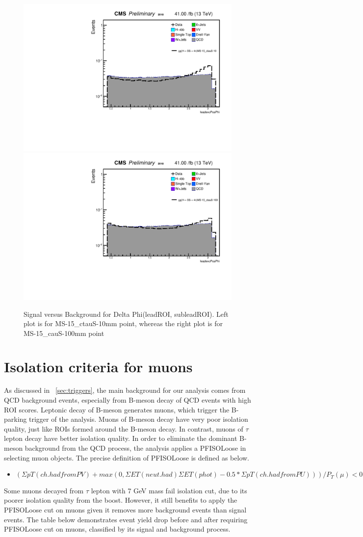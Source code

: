  \begin{figure}[h!]
   \caption{Signal versus Background for Delta Phi(leadROI, subleadROI). Left plot is for MS-15\_ctauS-10mm point, whereas the right plot is for MS-15\_cauS-100mm point}
   \label{fig:leadexcPosPhi}
   \centering
   \includegraphics[width=0.40\linewidth]{figs/AnalysisNoteplot_MS-15_ctauS-10_leadexcPosPhi.pdf}
   \includegraphics[width=0.40\linewidth]{figs/AnalysisNoteplot_MS-15_ctauS-100_leadexcPosPhi.pdf}
 \end{figure}

\section{Isolation criteria for muons}\label{ref:muISO}
As discussed in ~\ref{sec:triggers}, the main background for our analysis comes from QCD background events, especially from B-meson decay of QCD events with high ROI scores. 
Leptonic decay of B-meson generates muons, which trigger the B-parking trigger of the analysis.
Muons of B-meson decay have very poor isolation quality, just like ROIs formed around the B-meson decay.
In contrast, muons of $\tau$ lepton decay have better isolation quality.
In order to eliminate the dominant B-meson background from the QCD process, the analysis applies a PFISOLoose in selecting muon objects.
The precise definition of PFISOLoose is defined as below.
\begin{itemize}
  \item $(\Sigma pT(ch.had from PV)+max(0,\Sigma ET(neut.had) \Sigma ET (phot)-0.5* \Sigma pT(ch.had from PU)))/P_{T}(\mu)<0.25$
\end{itemize}

Some muons decayed from $\tau$ lepton with 7 GeV mass fail isolation cut, due to its poorer isolation quality from the boost.
However, it still benefits to apply the PFISOLoose cut on muons given it removes more background events than signal events.
The table below demonstrates event yield drop before and after requiring PFISOLoose cut on muons, classified by its signal and background process. 

